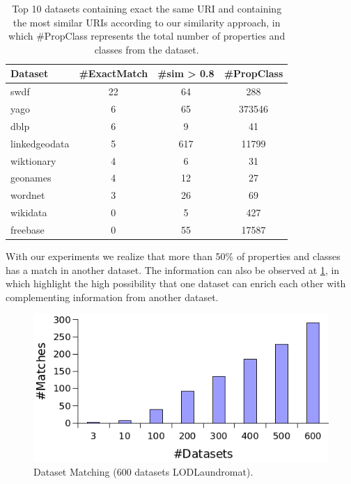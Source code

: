 \documentclass[sw]{iosart2x}
\begin{document}
\begin{table}[htb]
\centering
\begin{tabular}{lS[table-format=9.0]S[table-format=8.0]S[table-format=10.0]}
\toprule
\textbf{Dataset} & \textbf{\#ExactMatch} & \textbf{\#sim > 0.8} & \textbf{\#PropClass} \\
\midrule
swdf & 22 & 64 & 288 \\
yago & 6 & 65 & 373546 \\
dblp & 6 & 9 & 41 \\
linkedgeodata & 5 & 617 & 11799 \\
wiktionary & 4 & 6 & 31 \\
geonames & 4 & 12 & 27 \\
wordnet & 3 & 26 & 69 \\
wikidata & 0 & 5 & 427 \\
freebase & 0 & 55 & 17587 \\
\bottomrule
\end{tabular}
\caption{Top 10 datasets containing exact the same URI and containing the most similar URIs according to our similarity approach, in which \#PropClass represents the total number of properties and classes from the dataset. }
\label{tab:top10}
\end{table}



With our experiments we realize that more than 50\% of properties and classes has a match in another dataset. The information can also be observed at \cref{fig:match600Laundromat}, in which highlight the high possibility that one dataset can enrich each other with complementing information from another dataset.


\begin{figure}[htb] 
	\centering
	\includegraphics[width=\linewidth]{img/LaundromatDsMatch.png}
	\caption{Dataset Matching (600 datasets LODLaundromat).}
	\label{fig:match600Laundromat}
\end{figure}
\end{document}
